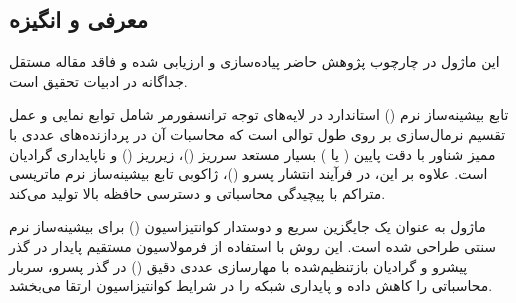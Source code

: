 \subsection{معرفی و انگیزه}
این ماژول در چارچوب پژوهش حاضر پیاده‌سازی و ارزیابی شده و فاقد مقاله مستقل جداگانه در ادبیات تحقیق است.

تابع بیشینه‌ساز نرم () استاندارد در لایه‌های توجه ترانسفورمر شامل توابع نمایی و عمل تقسیم نرمال‌سازی بر روی طول توالی است که محاسبات آن در پردازنده‌های عددی با ممیز شناور با دقت پایین ( یا ) بسیار مستعد سرریز ()، زیرریز () و ناپایداری گرادیان است. علاوه بر این، در فرآیند انتشار پسرو ()، ژاکوبی تابع بیشینه‌ساز نرم ماتریسی متراکم با پیچیدگی محاسباتی و دسترسی حافظه بالا تولید می‌کند.

ماژول  به عنوان یک جایگزین سریع و دوستدار کوانتیزاسیون () برای بیشینه‌ساز نرم سنتی طراحی شده است. این روش با استفاده از فرمولاسیون مستقیم پایدار در گذر پیشرو و گرادیان بازتنظیم‌شده با مهارسازی عددی دقیق () در گذر پسرو، سربار محاسباتی را کاهش داده و پایداری شبکه را در شرایط کوانتیزاسیون ارتقا می‌بخشد.
